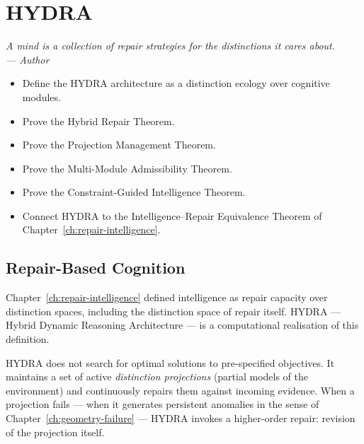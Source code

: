 \documentclass[12pt,twoside,openright]{book}
\newenvironment{epigraph}[2]{%
  \vspace{1em}\begin{flushright}
  \begin{minipage}{0.72\textwidth}
  \itshape\small #1\\[0.4em]
  \upshape\footnotesize\sffamily\color{DistGray}--- #2
  \end{minipage}\end{flushright}\vspace{1.5em}}{}
\newenvironment{objectives}{%
  \begin{tcolorbox}[colback=DistBlue!5,colframe=DistBlue,
    title={\faCheckCircle\enspace Learning Objectives},
    fonttitle=\sffamily\bfseries\color{white},
    attach boxed title to top left={yshift=-2mm,xshift=4mm},
    boxed title style={colback=DistBlue},breakable]
  \begin{itemize}[leftmargin=*,nosep]}{%
  \end{itemize}\end{tcolorbox}\vspace{1em}}
\begin{document}
\chapter{HYDRA}
\label{ch:hydra}

\begin{epigraph}{%
  A mind is a collection of repair strategies for
  the distinctions it cares about.}%
  {Author}
\end{epigraph}

\begin{objectives}
  \item Define the HYDRA architecture as a distinction
        ecology over cognitive modules.
  \item Prove the Hybrid Repair Theorem.
  \item Prove the Projection Management Theorem.
  \item Prove the Multi-Module Admissibility Theorem.
  \item Prove the Constraint-Guided Intelligence Theorem.
  \item Connect HYDRA to the Intelligence--Repair
        Equivalence Theorem of Chapter~\ref{ch:repair-intelligence}.
\end{objectives}

\section{Repair-Based Cognition}

Chapter~\ref{ch:repair-intelligence} defined intelligence
as repair capacity over distinction spaces, including
the distinction space of repair itself. HYDRA —
Hybrid Dynamic Reasoning Architecture — is a
computational realisation of this definition.

HYDRA does not search for optimal solutions to
pre-specified objectives. It maintains a set of
active \emph{distinction projections} (partial models
of the environment) and continuously repairs them
against incoming evidence. When a projection fails —
when it generates persistent anomalies in the sense of
Chapter~\ref{ch:geometry-failure} — HYDRA invokes a
higher-order repair: revision of the projection itself.
\end{document}
